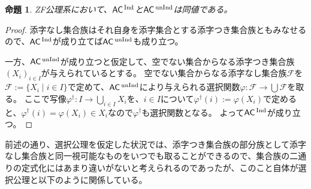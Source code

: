 \documentclass{jarticle}
\newtheorem{proposition}{命題}
\newcommand{\WithIndex}[1]{$\textrm{#1}{}^{\,\textrm{\scriptsize Ind}}$}
\newcommand{\WithoutIndex}[1]{$\textrm{#1}{}^{\,\textrm{\scriptsize unInd}}$}
\begin{document}
\begin{proposition}
\label{prop:two_AC_are_equivalent}
ZF公理系において、\WithIndex{$\mathsf{AC}$}と\WithoutIndex{$\mathsf{AC}$}は同値である。
\end{proposition}
\begin{proof}
添字なし集合族はそれ自身を添字集合とする添字つき集合族ともみなせるので、\WithIndex{$\mathsf{AC}$}が成り立てば\WithoutIndex{$\mathsf{AC}$}も成り立つ。

一方、\WithoutIndex{$\mathsf{AC}$}が成り立つと仮定して、空でない集合からなる添字つき集合族$(X_i)_{i \in I}$が与えられているとする。
空でない集合からなる添字なし集合族$\mathcal{F}$を$\mathcal{F} := \{X_i \mid i \in I\}$で定めて、\WithoutIndex{$\mathsf{AC}$}により与えられる選択関数$\varphi \colon \mathcal{F} \to \bigcup \mathcal{F}$を取る。
ここで写像$\varphi^{\dagger} \colon I \to \bigcup_{i \in I} X_i$を、$i \in I$について$\varphi^{\dagger}(i) := \varphi(X_i)$で定めると、$\varphi^{\dagger}(i) = \varphi(X_i) \in X_i$なので$\varphi^{\dagger}$も選択関数となる。
よって\WithIndex{$\mathsf{AC}$}が成り立つ。
\end{proof}

前述の通り、選択公理を仮定した状況では、添字つき集合族の部分族として添字なし集合族と同一視可能なものをいつでも取ることができるので、集合族の二通りの定式化にはあまり違いがないと考えられるのであったが、このこと自体が選択公理と以下のように関係している。
\end{document}
